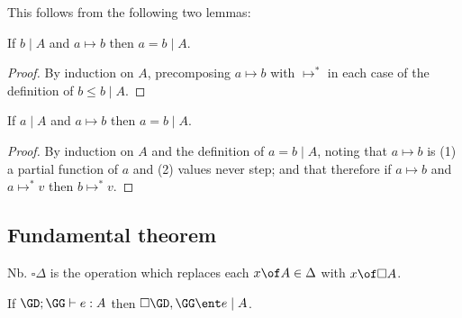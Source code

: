 \documentclass{article}
\newcommand{\step}{\mapsto}
\newcommand{\steps}{\step^*}
\newcommand{\lr}[2]{#2\mathrel{|}#1}
\newcommand{\lrcx}[3]{#1 \ent \lr{#2}{#3}}
\newcommand{\disc}[1]{\square{#1}}
\begin{document}
This follows from the following two lemmas:

\begin{lemma}
  If $\lr{A}{b}$ and $a \step b$ then $\lr{A}{a = b}$.
\end{lemma}

\begin{proof}
  By induction on $A$, precomposing $a \step b$ with $\steps$ in each case of
  the definition of $\lr{A}{b \le b}$.
\end{proof}

\begin{lemma}
  If $\lr{A}{a}$ and $a \step b$ then $\lr{A}{a = b}$.
\end{lemma}

\begin{proof}
  By induction on $A$ and the definition of $\lr{A}{a = b}$, noting that $a
  \step b$ is (1) a partial function of $a$ and (2) values never step; and that
  therefore if $a \step b$ and $a \steps v$ then $b \steps v$.
\end{proof}


\subsection{Fundamental theorem}

\newcommand{\cxdisc}[1]{\disc{#1}}

Nb. $\cxdisc{\Delta}$ is the operation which replaces each $x \of A \in \Delta$
with $x \of \disc{A}$.

\begin{theorem}
  If $\GD;\GG \vdash e : A$ then $\lrcx{\cxdisc{\GD},\GG}{A}{e}$.
\end{theorem}
\end{document}
